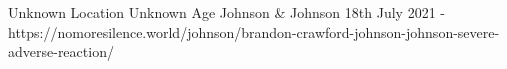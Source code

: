           {Unknown Location}
          {Unknown Age}
          {Johnson \& Johnson }
          {18th July 2021}
          {-}
          {https://nomoresilence.world/johnson/brandon-crawford-johnson-johnson-severe-adverse-reaction/}

